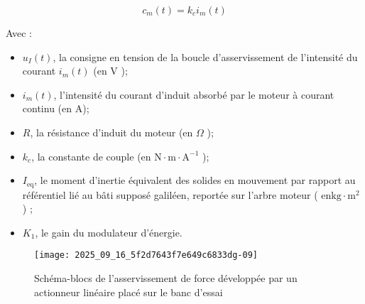 $$
c_{m}(t)=k_{c} i_{m}(t)
$$

Avec :

\begin{itemize}
  \item $u_{I}(t)$, la consigne en tension de la boucle d'asservissement de l'intensité du courant $i_{m}(t)$ (en V );
  \item $i_{m}(t)$, l'intensité du courant d'induit absorbé par le moteur à courant continu (en A);
  \item $R$, la résistance d'induit du moteur (en $\Omega$ );
  \item $k_{c}$, la constante de couple (en $\mathrm{N} \cdot \mathrm{m} \cdot \mathrm{A}^{-1}$ );
  \item $I_{\mathrm{eq}}$, le moment d'inertie équivalent des solides en mouvement par rapport au référentiel lié au bâti supposé galiléen, reportée sur l'arbre moteur ( $\mathrm{en} \mathrm{kg} \cdot \mathrm{m}^{2}$ ) ;
  \item $K_{1}$, le gain du modulateur d'énergie.
\end{itemize}



\begin{figure}[!h]
\centering
\texttt{[image: 2025\_09\_16\_5f2d7643f7e649c6833dg-09]}
\caption{\label{ccs_mp_2023_fig_11}  Schéma-blocs de l'asservissement de force développée par un actionneur linéaire placé sur le banc d'essai}
\end{figure}



\ifprof
\begin{corrige}
\end{corrige}
\else
\fi

\ifprof
\begin{corrige}
\end{corrige}
\else
\fi


